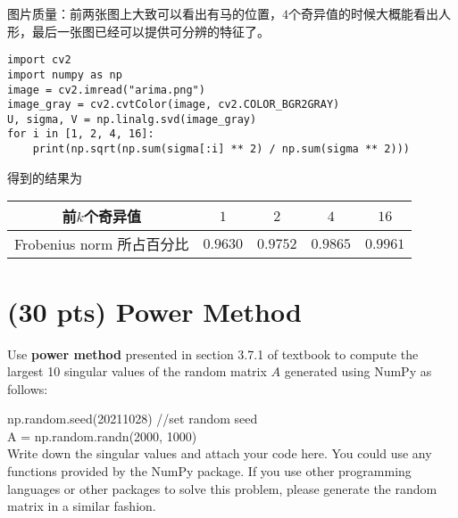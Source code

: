 \documentclass[11pt]{article}
\begin{document}
图片质量：前两张图上大致可以看出有马的位置，$4$个奇异值的时候大概能看出人形，最后一张图已经可以提供可分辨的特征了。

\begin{verbatim}
import cv2
import numpy as np
image = cv2.imread("arima.png")
image_gray = cv2.cvtColor(image, cv2.COLOR_BGR2GRAY)
U, sigma, V = np.linalg.svd(image_gray)
for i in [1, 2, 4, 16]:
    print(np.sqrt(np.sum(sigma[:i] ** 2) / np.sum(sigma ** 2)))
\end{verbatim}
得到的结果为

\begin{center}
	\begin{tabular}{|c|c|c|c|c|}
		\hline 
		前$k$个奇异值 & $1$ & $2$ & $4$ & $16$ \\ 
		\hline 
		Frobenius norm 所占百分比 & $0.9630$ & $0.9752$ & $0.9865$ & $0.9961$\\
		\hline
	\end{tabular}
\end{center}

  \section{(30 pts) Power Method}
  Use {\bf{power method}} presented in section 3.7.1 of textbook to compute the largest 10 singular values of the random matrix $A$ generated using NumPy as follows:
  
np.random.seed(20211028) //set random seed \\
A = np.random.randn(2000, 1000)\\
  Write down the singular values and attach your code here. You could use any functions provided by the NumPy package.
  If you use other programming languages or other packages to solve this problem, please generate the random matrix in a similar fashion.
\end{document}
